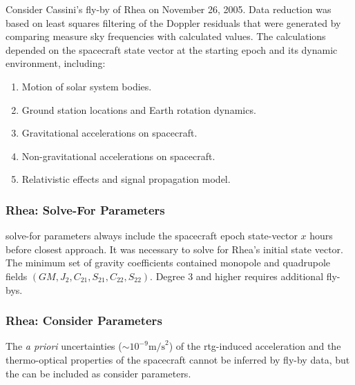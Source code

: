 \documentclass{article}
\begin{document}
                        \begin{example}[Rhea]
                            Consider Cassini's fly-by of Rhea on
                            November 26, 2005. Data reduction was based
                            on least squares filtering of the Doppler
                            residuals that were generated by comparing
                            measure sky frequencies with calculated
                            values. The calculations depended on the
                            spacecraft state vector at the starting
                            epoch and its dynamic environment,
                            including:
                            \begin{enumerate}
                                \item Motion of solar system bodies.
                                \item Ground station locations and
                                      Earth rotation dynamics.
                                \item Gravitational accelerations
                                      on spacecraft.
                                \item Non-gravitational accelerations
                                      on spacecraft.
                                \item Relativistic effects and
                                      signal propagation model.
                            \end{enumerate}
                        \end{example}
                    \subsubsection{%
                        \footnotesize{Rhea: Solve-For Parameters}}
                        \Gls{solve-for parameters} always include
                        the spacecraft epoch state-vector $x$ hours
                        before closest approach. It was necessary to
                        solve for Rhea's initial state vector.
                        The minimum set of gravity coefficients
                        contained \gls{monopole} and \gls{quadrupole}
                        fields $(GM,J_2,C_{21},S_{21},C_{22},S_{22})$.
                        Degree $3$ and higher requires additional fly-bys.
                    \subsubsection{%
                        \footnotesize{Rhea: Consider Parameters}}
                        The \textit{a priori} uncertainties
                        ($\sim 10^{-9}\textrm{m/s}^{2}$)
                        of the \gls{rtg}-induced acceleration and
                        the thermo-optical properties of the
                        spacecraft cannot be inferred by fly-by data,
                        but the can be included as
                        \gls{consider parameters}. 
\end{document}
